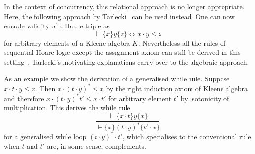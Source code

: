 \documentclass{llncs}
\begin{document}
In the context of concurrency, this relational approach is no longer
appropriate. Here, the following approach by
Tarlecki~\cite{tarlecki_language_1985} can be used instead. One can
now encode validity of a Hoare triple as
\begin{equation*}
  \vdash \{x\}y\{z\} \Leftrightarrow x \cdot y \le z
\end{equation*}
for arbitrary elements of a Kleene algebra $K$. Nevertheless all the
rules of sequential Hoare logic except the assignment axiom can still
be derived in this setting~\cite{hoare_concurrent_2011}. Tarlecki's motivating
explanations carry over to the algebraic approach.

As an example we show the derivation of a generalised while
rule. Suppose $x\cdot t\cdot y\le x$. Then $x\cdot (t\cdot y)^\ast \le
x$ by the right induction axiom of Kleene algebra and therefore
$x\cdot (t\cdot y)^\ast t'\le x\cdot t'$ for arbitrary element $t'$ by
isotonicity of multiplication. This derives the while rule
\begin{equation*}
  \frac{\vdash \{x\cdot t\}y\{x\}}{\vdash \{x\}(t\cdot y)^\ast\{t'\cdot x\}}
\end{equation*}
for a generalised while loop $(t\cdot y)^\ast\cdot t'$, which
specialises to the conventional rule when $t$ and $t'$ are, in some
sense, complements.
\end{document}
